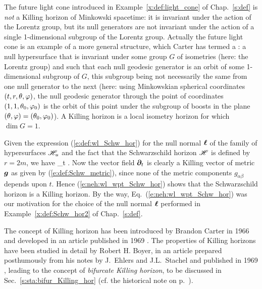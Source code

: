 \begin{example}
The future light cone introduced in Example~\ref{x:def:light_cone} of Chap.~\ref{s:def} is \emph{not} a
Killing horizon of Minkowski spacetime: it is invariant under the action
of the Lorentz group, but its null generators are not invariant
under the action of a single 1-dimensional subgroup of the Lorentz group.
Actually the future light cone is an example of a more general structure,
which Carter has termed a
 \cite{Carte67,Carte69}: a null hypersurface that is invariant under
some group $G$ of isometries (here: the Lorentz group) and such that each null
geodesic generator is an orbit of some 1-dimensional subgroup of $G$,
this subgroup being not necessarily the same from one null generator to the next
(here: using Minkowskian spherical
coordinates $(t,r,\theta,\varphi)$,
the null geodesic generator through the point of coordinates $(1,1,\theta_0,\varphi_0)$
is the orbit of this point under the subgroup of boosts in the plane
$(\theta,\varphi) = (\theta_0,\varphi_0)$). A Killing horizon is a local isometry horizon
for which $\dim G = 1$.
\end{example}


\begin{example} \label{x:neh:Schwarz_KH}
Given the expression (\ref{e:def:wl_Schw_hor}) for the null normal $\bm{\ell}$
of the family of hypersurfaces $\mathscr{H}_u$ and the fact that the Schwarzschild
horizon $\mathscr{H}$ is defined by $r=2m$, we have
\be \label{e:neh:wl_wpt_Schw_hor}
    \wl \equalH \wpar_t .
\ee
Now the vector field $\bm{\partial}_t$ is clearly a Killing vector of metric $\bm{g}$
as given by (\ref{e:def:Schw_metric}), since none of the metric components
$g_{\alpha\beta}$ depends upon $t$. Hence (\ref{e:neh:wl_wpt_Schw_hor})
shows that the Schwarzschild horizon is a Killing horizon. By the way,
Eq.~(\ref{e:neh:wl_wpt_Schw_hor}) was our motivation for the choice of the
null normal $\bm{\ell}$ performed in Example~\ref{x:def:Schw_hor2} of Chap.~\ref{s:def}.
\end{example}

\begin{hist}
The concept of Killing horizon has been introduced by Brandon Carter in
1966 \cite{Carte66,Carte67} and developed in an article published in
1969 \cite{Carte69}. The properties of Killing horizons have been
studied in detail by Robert H. Boyer,
in an article prepared posthumously from his notes
by J.~Ehlers and J.L.~Stachel and published in 1969 \cite{Boyer69},
leading to the concept of \emph{bifurcate Killing horizon}, to be discussed in
Sec.~\ref{s:sta:bifur_Killing_hor} (cf. the historical note on p.~\pageref{h:sta:Boyer}).
\end{hist}

